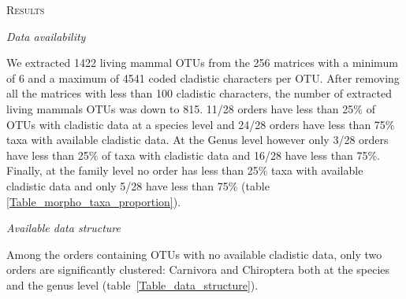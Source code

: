 \documentclass[12pt,letterpaper]{article}
\renewcommand{\section}[1]{%
\bigskip
\begin{center}
\begin{Large}
\normalfont\scshape #1
\medskip
\end{Large}
\end{center}}
\renewcommand{\subsection}[1]{%
\bigskip
\begin{center}
\begin{large}
\normalfont\itshape #1
\end{large}
\end{center}}
\renewcommand{\subsubsection}[1]{%
\vspace{2ex}
\noindent
\textit{#1.}---}
\begin{document}

%
%

\section{Results}

\subsection{Data availability}
We extracted 1422 living mammal OTUs from the 256 matrices with a minimum of 6 and a maximum of 4541 coded cladistic characters per OTU.
After removing all the matrices with less than 100 cladistic characters, the number of extracted living mammals OTUs was down to 815.
11/28 orders have less than 25\% of OTUs with cladistic data at a species level and 24/28 orders have less than 75\% taxa with available cladistic data.
At the Genus level however only 3/28 orders have less than 25\% of taxa with cladistic data and 16/28 have less than 75\%.
Finally, at the family level no order has less than 25\% taxa with available cladistic data and only 5/28 have less than 75\% (table \ref{Table_morpho_taxa_proportion}).

\renewcommand\baselinestretch{1.2}\selectfont
\begin{center}

\end{center}
\renewcommand\baselinestretch{2}\selectfont

\subsection{Available data structure}
Among the orders containing OTUs with no available cladistic data, only two orders are significantly clustered: Carnivora and Chiroptera both at the species and the genus level (table~\ref{Table_data_structure}).

\renewcommand\baselinestretch{1.2}\selectfont
\begin{center}

\end{center}
\renewcommand\baselinestretch{2}\selectfont
\end{document}
